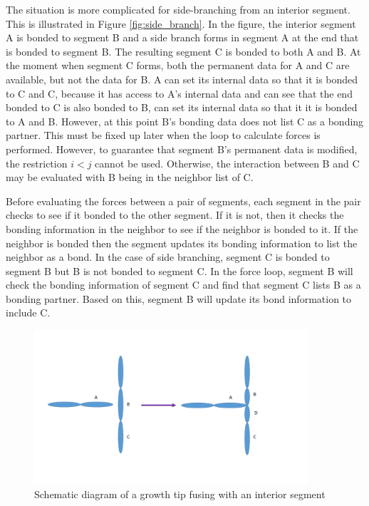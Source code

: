 \documentclass[12pt]{article}
\begin{document}
The situation is more complicated for side-branching from an interior segment. This
is illustrated in Figure \ref{fig:side_branch}. In the figure, the interior segment A is bonded
to segment B and a side branch forms in segment A at the end that is bonded to segment B. The
resulting segment C is bonded to both A and B. At the moment when segment C forms, both the
permanent data for A and C are available, but not the data for B. A can set its internal data
so that it is bonded to C and C, because it has access to A's internal data and can see that the
end bonded to C is also bonded to B, can set its
internal data so that it it is bonded to A and B. However, at this point B's bonding data does
not list C as a bonding partner. This must be fixed up later when the loop to calculate forces
is performed.  However, to
guarantee that segment B's permanent data is modified, the restriction $i<j$ cannot be used.
Otherwise, the interaction between B and C may be evaluated with B being in the
neighbor list of C.

Before evaluating the forces between a pair of segments, each segment in the pair
checks to see if it bonded to the other segment. If it is not, then it checks the bonding
information in the neighbor to see if the neighbor is bonded to it. If the neighbor is bonded
then the segment updates its bonding information to list the neighbor as a bond. In the case
of side branching, segment C is bonded to segment B but B is not bonded to segment C.
In the force loop, segment B will check the bonding information of segment C and find that
segment C lists B as a bonding partner. Based on this, segment B will update its bond
information to include C.

\begin{figure}
\centering
\includegraphics[width=4.0in,keepaspectratio=true]{fusion}
\caption{\label{fig:fusion} Schematic diagram of a growth tip fusing with an interior segment}
\end{figure}
\end{document}
